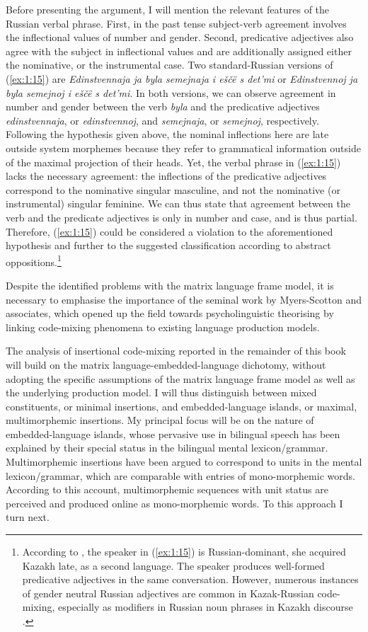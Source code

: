 \noindent Before presenting the argument, I will mention the relevant features of the Russian verbal phrase. First, in the past tense subject-verb agreement involves the inflectional values of number and gender. Second, predicative adjectives also agree with the subject in inflectional values and are additionally assigned either the nominative, or the instrumental case. Two standard-Russian versions of (\ref{ex:1:15}) are \textit{Edinstvennaja ja byla semejnaja i eščë s det'mi} or \textit{Edinstvennoj ja byla semejnoj i eščë s det'mi}.  In both versions, we can observe agreement in number and gender between the verb \textit{byla} and the predicative adjectives \textit{edinstvennaja}, or \textit{edinstvennoj}, and \textit{semejnaja}, or \textit{semejnoj}, respectively. Following the hypothesis given above, the nominal inflections here are late outside system morphemes because they refer to grammatical information outside of the maximal projection of their heads. Yet, the verbal phrase in (\ref{ex:1:15}) lacks the necessary agreement: the inflections of the predicative adjectives correspond to the nominative singular masculine, and not the nominative (or instrumental) singular feminine. We can thus state that agreement between the verb and the predicate adjectives is only in number and case, and is thus partial. Therefore, (\ref{ex:1:15}) could be considered a violation to the aforementioned hypothesis and further to the suggested classification according to abstract oppositions.\footnote{According to \citet[92]{muhamedowa-untersuchung-2006}, the speaker in (\ref{ex:1:15}) is Russian-dominant, she acquired Kazakh late, as a second language. The speaker produces well-formed predicative adjectives in the same conversation. However, numerous instances of gender neutral Russian adjectives are common in Kazak-Russian code-mixing, especially as modifiers in Russian noun phrases in Kazakh discourse \citep[cf.][77--93]{muhamedowa-untersuchung-2006}.}

Despite the identified problems with the matrix language frame model, it is necessary to emphasise the importance of the seminal work by Myers-Scotton and associates, which opened up the field towards psycholinguistic theorising by linking code-mixing phenomena to existing language production models.

The analysis of insertional code-mixing reported in the remainder of this book will build on the matrix language-embedded-language dichotomy, without adopting the specific assumptions of the matrix language frame model as well as the underlying production model. I will thus distinguish between mixed constituents, or minimal insertions, and embedded-language islands, or maximal, multimorphemic insertions. My principal focus will be on the nature of em\-bed\-ded-lan\-guage islands, whose pervasive use in bilingual speech has been explained by their special status in the bilingual mental lexicon/grammar. Multimorphemic insertions have been argued to correspond to units in the  mental lexicon/grammar, which are comparable with entries of mono-morphemic words. According to this account, multimorphemic sequences with unit status are perceived and produced online as mono-morphemic words. To this approach I turn next.

